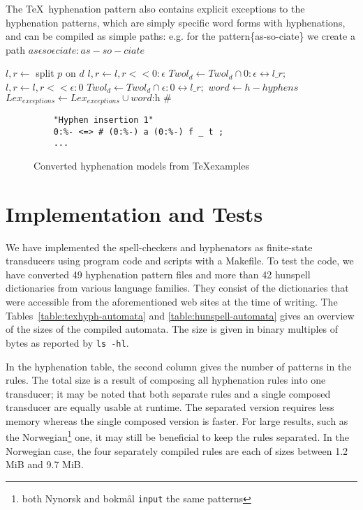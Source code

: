 \documentclass[postprint]{flammie}
\begin{document}
The \TeX\ hyphenation pattern also contains explicit exceptions to the
hyphenation patterns, which are simply specific word forms with hyphenations,
and can be compiled as simple paths: e.g. for the pattern\{as-so-ciate\} we
create a path $as\epsilon so\epsilon ciate:as-so-ciate$

\begin{algorithm}[tbp]
  \caption{Extracting hyphenation patterns from \TeX}
  \label{algo:texpat}
  \begin{algorithmic}[2]
    \STATE $l, r \leftarrow$ split $p$ on $d$
    \STATE $l, r \leftarrow l, r << 0:\epsilon$
    \STATE $Twol_d \leftarrow Twol_d \cap 0:\epsilon \leftrightarrow l \_ r ;$
    \ELSE
    \STATE $l, r \leftarrow l, r << \epsilon:0$
    \STATE $Twol_d \leftarrow Twol_d \cap \epsilon:0 \leftrightarrow l \_ r ;$
    \ENDIF
    \ENDFOR
    \ENDFOR
    \STATE $word \leftarrow h - hyphens$
    \STATE $Lex_{exceptions} \leftarrow Lex_{exceptions} \cup \textit{word:h \#}$
    \ENDFOR
  \end{algorithmic}
\end{algorithm}

\begin{figure}[tbp]
  \centering
  \begin{lstlisting}
    "Hyphen insertion 1"
    0:%- <=> # (0:%-) a (0:%-) f _ t ;
    ...
  \end{lstlisting}
  \caption{Converted hyphenation models from \TeX examples}
  \label{fig:twolc-hyphen-models}
\end{figure}

\section{Implementation and Tests}

We have implemented the spell-checkers and hyphenators as finite-state
transducers using program code and scripts with a Makefile.  To test the code, we have
converted 49 hyphenation pattern files and more than 42 hunspell
dictionaries from various language families. They consist of the dictionaries that were accessible from the
aforementioned web sites at the time of writing. The
Tables~\ref{table:texhyph-automata} and \ref{table:hunspell-automata}
gives an overview of the sizes of the compiled automata. The size is given in binary multiples
of bytes as reported by \texttt{ls -hl}. 

In the hyphenation table, the second
column gives the number of patterns in the rules. The total size is a result of
composing all hyphenation rules into one transducer; it may be noted that
both separate rules and a single composed transducer are equally usable at runtime. The separated
version requires less memory whereas the single composed version is faster.  For large results, such as the
Norwegian\footnote{both Nynorsk and bokmål \texttt{input} the same patterns}
one, it may still be beneficial to keep the rules separated. In the Norwegian
case, the four separately compiled rules are each of sizes between 1.2 MiB and 9.7 MiB.
\end{document}
